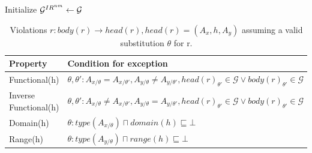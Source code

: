 \documentclass[a4paper,UKenglish,cleveref, autoref, thm-restate]{tgdk-v2021}
\begin{document}
\begin{algorithm}[t]
\SetAlgoLined
\DontPrintSemicolon
{}


\BlankLine
Initialize $\mathcal{G}^{IR^{nm}} \leftarrow \mathcal{G}$\;
\BlankLine

\Return{$\GIRnm$}

\caption{Materialize $\mathcal{G}^{IR^{nm}}$}
\label{alg:materialize}
\end{algorithm}
%
\begin{table}[t]
    \centering
    \caption{Violations $r: body(r)\rightarrow head(r),head(r) =(A_x, h, A_y)$ assuming a valid substitution $\theta$ for r.}
    \begin{tabular}{|l|l|}
        \hline
        \textbf{Property} & \textbf{Condition for exception} \\
        \hline
        Functional(h)  & $\theta,\theta':A_{x/\theta} =A_{x/\theta'},A_{y/\theta} \neq A_{y/\theta'}, head(r)_{\theta'} \in \mathcal{G} \lor body(r)_{\theta'} \in \mathcal{G}$ \\
        \hline
        Inverse Functional(h) & $\theta,\theta':A_{x/\theta} \neq A_{x/\theta'},A_{y/\theta} = A_{y/\theta'}, head(r)_{\theta'} \in \mathcal{G} \lor body(r)_{\theta'} \in \mathcal{G}$ \\
        \hline
        Domain(h) & $\theta: type(A_{x/\theta}) \sqcap domain(h) \sqsubseteq \bot$ \\
        \hline
        Range(h) & $\theta: type(A_{y/\theta}) \sqcap range(h) \sqsubseteq \bot$  \\
        \hline
    \end{tabular}   
    
    \label{tab:ijp}
\end{table}
\end{document}

